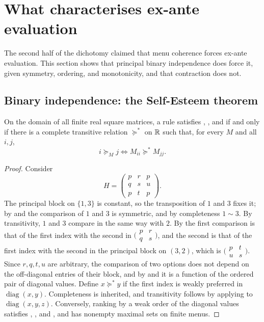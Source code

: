 \section{What characterises ex-ante evaluation}\label{sec:exante}

The second half of the dichotomy claimed that menu coherence forces ex-ante evaluation. This section
shows that principal binary independence does force it, given symmetry, ordering, and monotonicity,
and that contraction does not.

\subsection{Binary independence: the Self-Esteem theorem}

\begin{theorem}\label{thm:selfesteem}
On the domain of all finite real square matrices, a rule satisfies , \Bpr, and  if and only if
there is a complete transitive relation $\succeq^*$ on $\mathbb{R}$ such that, for every $M$ and all $i,j$,
\[
  i\succeq_Mj\iff M_{ii}\succeq^*M_{jj}.
\]
\end{theorem}

\begin{proof}
Consider
\[
  H=\begin{pmatrix}p&r&p\\q&s&u\\p&t&p\end{pmatrix}.
\]
The principal block on $\{1,3\}$ is constant, so the transposition of $1$ and $3$ fixes it; by  and
\Bpr{} the comparison of $1$ and $3$ is symmetric, and by completeness $1\sim3$. By transitivity, $1$ and
$3$ compare in the same way with $2$. By \Bpr{} the first comparison is that of the first index with the
second in $\bigl(\begin{smallmatrix}p&r\\q&s\end{smallmatrix}\bigr)$, and the second is that of the first
index with the second in the principal block on $(3,2)$, which is
$\bigl(\begin{smallmatrix}p&t\\u&s\end{smallmatrix}\bigr)$. Since $r,q,t,u$ are arbitrary, the comparison
of two options does not depend on the off-diagonal entries of their block, and by \Bpr{} and  it is
a function of the ordered pair of diagonal values. Define $x\succeq^*y$ if the first index is weakly
preferred in $\operatorname{diag}(x,y)$. Completeness is inherited, and transitivity follows by applying
\Bpr{} to $\operatorname{diag}(x,y,z)$. Conversely, ranking by a weak order of the diagonal values satisfies
, \Bpr, and , and has nonempty maximal sets on finite menus.
\end{proof}

